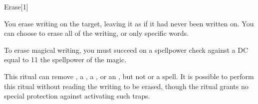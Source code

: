 \begin{spellsection}{Erase}[1]
    \begin{spellheader}
    \end{spellheader}
    \begin{spellcontent}
        \begin{spelltargetinginfo}
        \end{spelltargetinginfo}
        \begin{spelleffects}

            \spelleffect You erase writing on the target, leaving it as if it had never been written on. You can choose to erase all of the writing, or only specific words.

            To erase magical writing, you must succeed on a spellpower check against a DC equal to 11 \add the spellpower of the magic.
        \end{spelleffects}
    \end{spellcontent}
    \begin{spellfooter}
        \spellnotes This ritual can remove , a , a , or an , but not  or a  spell. It is possible to perform this ritual without reading the writing to be erased, though the ritual grants no special protection against activating such traps.
    \end{spellfooter}
\end{spellsection}

